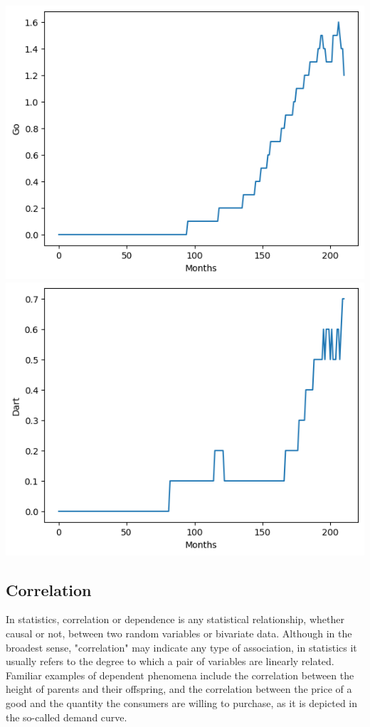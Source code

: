 \documentclass[conference]{IEEEtran}
\begin{document}
\includegraphics[scale=0.4]{lineplot/go.png}
\includegraphics[scale=0.4]{lineplot/dart.png}

\subsection{Correlation}
In statistics, correlation or dependence is any statistical relationship, whether causal or not, between two random variables or bivariate data. Although in the broadest sense, "correlation" may indicate any type of association, in statistics it usually refers to the degree to which a pair of variables are linearly related. Familiar examples of dependent phenomena include the correlation between the height of parents and their offspring, and the correlation between the price of a good and the quantity the consumers are willing to purchase, as it is depicted in the so-called demand curve.
\end{document}

